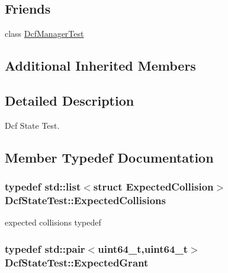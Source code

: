\subsection*{Friends}
\begin{DoxyCompactItemize}
\item 
class \hyperlink{classDcfStateTest_afc6ebcc58c473ff8cab1203d690a305d}{Dcf\+Manager\+Test}
\end{DoxyCompactItemize}
\subsection*{Additional Inherited Members}


\subsection{Detailed Description}
Dcf State Test. 

\subsection{Member Typedef Documentation}
\subsubsection[{\texorpdfstring{Expected\+Collisions}{ExpectedCollisions}}]{\setlength{\rightskip}{0pt plus 5cm}typedef {\bf std\+::list}$<$struct {\bf Expected\+Collision}$>$ {\bf Dcf\+State\+Test\+::\+Expected\+Collisions}\hspace{0.3cm}{\ttfamily [private]}}\hypertarget{classDcfStateTest_a19c48366165666efb137f2644a4027c8}{}\label{classDcfStateTest_a19c48366165666efb137f2644a4027c8}


expected collisions typedef 

\subsubsection[{\texorpdfstring{Expected\+Grant}{ExpectedGrant}}]{\setlength{\rightskip}{0pt plus 5cm}typedef std\+::pair$<$uint64\+\_\+t,uint64\+\_\+t$>$ {\bf Dcf\+State\+Test\+::\+Expected\+Grant}\hspace{0.3cm}{\ttfamily [private]}}\hypertarget{classDcfStateTest_ab4ef0fa1b9d36f663a102531dab3422e}{}\label{classDcfStateTest_ab4ef0fa1b9d36f663a102531dab3422e}


